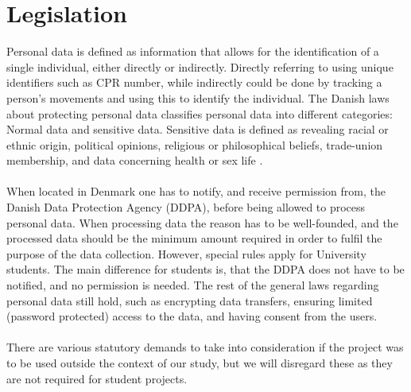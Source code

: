 
\section{Legislation}
\label{sec:legislation}

Personal data is defined as information that allows for the identification of a single individual, either directly or indirectly. Directly referring to using unique identifiers such as CPR number, while indirectly could be done by tracking a person's movements and using this to identify the individual. The Danish laws about protecting personal data classifies personal data into different categories: Normal data and sensitive data. Sensitive data is defined as revealing racial or ethnic origin, political opinions, religious or philosophical beliefs, trade-union membership, and data concerning health or sex life \parencite{datatilsynet_stud1}. 
\\\\
When located in Denmark one has to notify, and receive permission from, the Danish Data Protection Agency (DDPA), before being allowed to process personal data. When processing data the reason has to be well-founded, and the processed data should be the minimum amount required in order to fulfil the purpose of the data collection. However, special rules apply for University students. The main difference for students is, that the DDPA does not have to be notified, and no permission is needed. The rest of the general laws regarding personal data still hold, such as encrypting data transfers, ensuring limited (password protected) access to the data, and having consent from the users. 
\\\\
There are various statutory demands to take into consideration if the project was to be used outside the context of our study, but we will disregard these as they are not required for student projects. 




